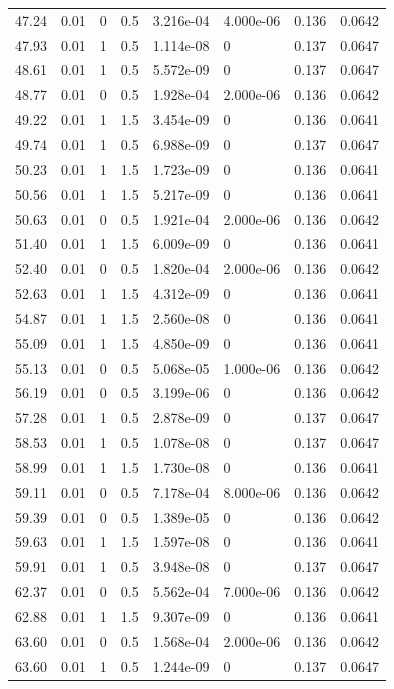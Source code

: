 \documentclass[preview]{standalone}
\begin{document}
{{{\begin{tabular}{L{1.2cm}C{1.2cm} C{0.3cm}C{0.5cm} C{1.4cm}C{1.4cm} C{1.4cm}C{1.4cm}}
  47.24  &  0.01  & 0     & 0.5 &  3.216e-04  & 4.000e-06  & 0.136 &  0.0642   \\ 
  47.93  &  0.01  & 1     & 0.5 &  1.114e-08  & 0  & 0.137 &  0.0647   \\ 
  48.61  &  0.01  & 1     & 0.5 &  5.572e-09  & 0  & 0.137 &  0.0647   \\ 
  48.77  &  0.01  & 0     & 0.5 &  1.928e-04  & 2.000e-06  & 0.136 &  0.0642   \\ 
  49.22  &  0.01  & 1     & 1.5 &  3.454e-09  & 0  & 0.136 &  0.0641   \\ 
  49.74  &  0.01  & 1     & 0.5 &  6.988e-09  & 0  & 0.137 &  0.0647   \\ 
  50.23  &  0.01  & 1     & 1.5 &  1.723e-09  & 0  & 0.136 &  0.0641   \\ 
  50.56  &  0.01  & 1     & 1.5 &  5.217e-09  & 0  & 0.136 &  0.0641   \\ 
  50.63  &  0.01  & 0     & 0.5 &  1.921e-04  & 2.000e-06  & 0.136 &  0.0642   \\ 
  51.40  &  0.01  & 1     & 1.5 &  6.009e-09  & 0  & 0.136 &  0.0641   \\ 
  52.40  &  0.01  & 0     & 0.5 &  1.820e-04  & 2.000e-06  & 0.136 &  0.0642   \\ 
  52.63  &  0.01  & 1     & 1.5 &  4.312e-09  & 0  & 0.136 &  0.0641   \\ 
  54.87  &  0.01  & 1     & 1.5 &  2.560e-08  & 0  & 0.136 &  0.0641   \\ 
  55.09  &  0.01  & 1     & 1.5 &  4.850e-09  & 0  & 0.136 &  0.0641   \\ 
  55.13  &  0.01  & 0     & 0.5 &  5.068e-05  & 1.000e-06  & 0.136 &  0.0642   \\ 
  56.19  &  0.01  & 0     & 0.5 &  3.199e-06  & 0  & 0.136 &  0.0642   \\ 
  57.28  &  0.01  & 1     & 0.5 &  2.878e-09  & 0  & 0.137 &  0.0647   \\ 
  58.53  &  0.01  & 1     & 0.5 &  1.078e-08  & 0  & 0.137 &  0.0647   \\ 
  58.99  &  0.01  & 1     & 1.5 &  1.730e-08  & 0  & 0.136 &  0.0641   \\ 
  59.11  &  0.01  & 0     & 0.5 &  7.178e-04  & 8.000e-06  & 0.136 &  0.0642   \\ 
  59.39  &  0.01  & 0     & 0.5 &  1.389e-05  & 0  & 0.136 &  0.0642   \\ 
  59.63  &  0.01  & 1     & 1.5 &  1.597e-08  & 0  & 0.136 &  0.0641   \\ 
  59.91  &  0.01  & 1     & 0.5 &  3.948e-08  & 0  & 0.137 &  0.0647   \\ 
  62.37  &  0.01  & 0     & 0.5 &  5.562e-04  & 7.000e-06  & 0.136 &  0.0642   \\ 
  62.88  &  0.01  & 1     & 1.5 &  9.307e-09  & 0  & 0.136 &  0.0641   \\ 
  63.60  &  0.01  & 0     & 0.5 &  1.568e-04  & 2.000e-06  & 0.136 &  0.0642   \\ 
  63.60  &  0.01  & 1     & 0.5 &  1.244e-09  & 0  & 0.137 &  0.0647   \\ 
\hline 
\end{tabular} 

}}}
\end{document}
